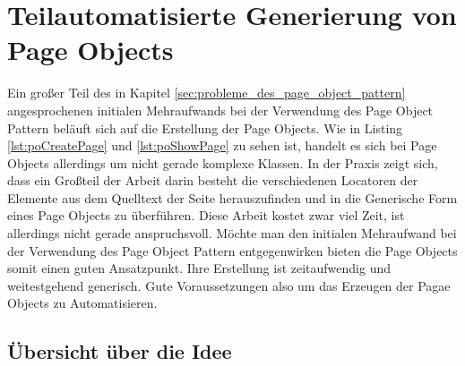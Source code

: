 \chapter{Teilautomatisierte Generierung von Page Objects}
\label{sec:teilautomatisierte_generierung_von_pageObjects}

Ein großer Teil des in Kapitel \ref{sec:probleme_des_page_object_pattern} angesprochenen initialen Mehraufwands bei der Verwendung des Page Object Pattern beläuft sich auf die Erstellung der Page Objects.
Wie in Listing \ref{lst:poCreatePage} und \ref{lst:poShowPage} zu sehen ist, handelt es sich bei Page Objects allerdings um nicht gerade komplexe Klassen. In der Praxis zeigt sich, dass ein Großteil der Arbeit darin besteht die verschiedenen Locatoren der Elemente aus dem Quelltext der Seite herauszufinden und in die Generische Form eines Page Objects zu überführen.
Diese Arbeit kostet zwar viel Zeit, ist allerdings nicht gerade anspruchsvoll.
Möchte man den initialen Mehraufwand bei der Verwendung des Page Object Pattern entgegenwirken bieten die Page Objects somit einen guten Ansatzpunkt.
Ihre Erstellung ist zeitaufwendig und weitestgehend generisch. Gute Voraussetzungen also um das Erzeugen der Pagae Objects zu Automatisieren.
\section{Übersicht über die Idee}

